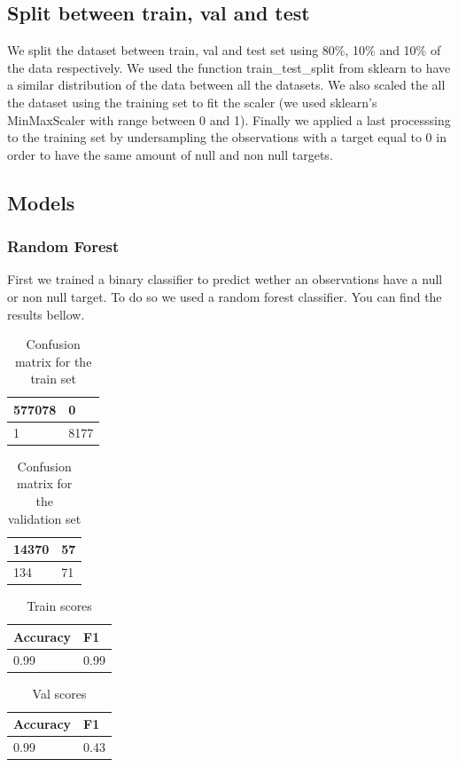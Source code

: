 \documentclass[a4paper, 12pt, one column]{article}
\begin{document}
\subsection{Split between train, val and test}

We split the dataset between train, val and test set using 80\%, 10\% and 10\% of the data respectively.
We used the function train_test_split from sklearn to have a similar distribution of the data between all the datasets.
We also scaled the all the dataset using the training set to fit the scaler (we used sklearn's MinMaxScaler with range between 0 and 1).
Finally we applied a last processsing to the training set by undersampling the observations with a target equal to 0 in order to have the
same amount of null and non null targets.


\subsection{Models}

\subsubsection{Random Forest}

First we trained a binary classifier to predict wether an observations have a null or non null target. To do so we used a random forest classifier.
You can find the results bellow.

\begin{table}[H]
\centering
\begin{tabular}{|l|l|}
    \hline
    577078 & 0\\ \hline
    1 & 8177\\ \hline
\end{tabular}
\caption{Confusion matrix for the train set}
\label{tab:cm_train}
\end{table}
\begin{table}[H]
\centering
\begin{tabular}{|l|l|}
    \hline
    14370 & 57\\ \hline
    134 & 71\\ \hline
\end{tabular}
\caption{Confusion matrix for the validation set}
\label{tab:cm_val}
\end{table}


\begin{table}[H]
\centering
\begin{tabular}{|l|l|}
    \hline
    Accuracy & F1\\ \hline
    0.99 & 0.99\\ \hline
\end{tabular}
\caption{Train scores}
\label{tab:train_scores}
\end{table}
\begin{table}[H]
\centering
\begin{tabular}{|l|l|}
    \hline
    Accuracy & F1\\ \hline
    0.99 & 0.43\\ \hline
\end{tabular}
\caption{Val scores}
\label{tab:val_scores}
\end{table}
\end{document}
